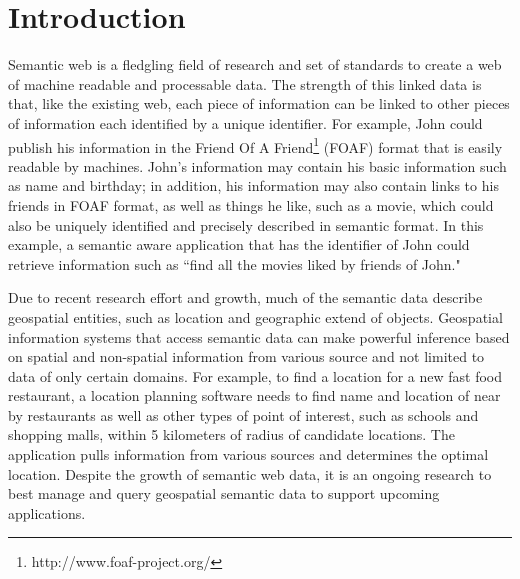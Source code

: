 \section{Introduction}

%
%

Semantic web is a fledgling field of research and set of standards to create a web of machine readable and processable data. The strength of this linked data is that, like the existing web, each piece of information can be linked to other pieces of information each identified by a unique identifier. For example, John could publish his information in the Friend Of A Friend\footnote{http://www.foaf-project.org/} (FOAF) format that is easily readable by machines. John's information may contain his basic information such as name and birthday; in addition, his information may also contain links to his friends in FOAF format, as well as things he like, such as a movie, which could also be uniquely identified and precisely described in semantic format\cite{lee:semantic_web}. In this example, a semantic aware application that has the identifier of John could retrieve information such as ``find all the movies liked by friends of John."

Due to recent research effort and growth, much of the semantic data describe geospatial entities, such as location and geographic extend of objects. Geospatial information systems that access semantic data can make powerful inference based on spatial and non-spatial information from various source and not limited to data of only certain domains. For example, to find a location for a new fast food restaurant, a location planning software needs to find name and location of near by restaurants as well as other types of point of interest, such as schools and shopping malls, within 5 kilometers of radius of candidate locations. The application pulls information from various sources and determines the optimal location. Despite the growth of semantic web data, it is an ongoing research to best manage and query geospatial semantic data to support upcoming applications.

